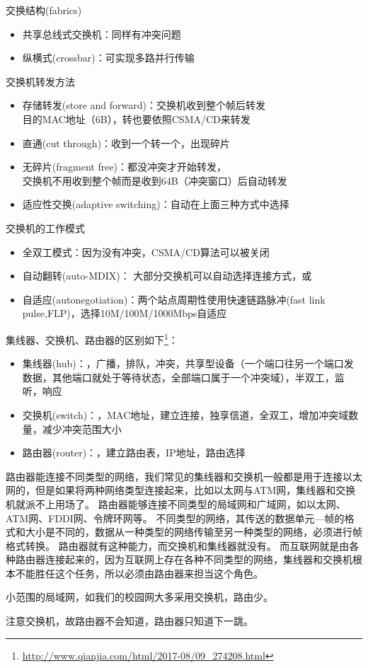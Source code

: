 \myhline
交换结构(fabrics)
\begin{itemize}
	\item 共享总线式交换机：同样有冲突问题
	\item 纵横式(crossbar)：可实现多路并行传输
\end{itemize}

\myhline
交换机转发方法
\begin{itemize}
\item 存储转发(store and forward)：交换机收到整个帧后转发\\
目的MAC地址（6B），转也要依照CSMA/CD来转发
\item 直通(cut through)：收到一个转一个，出现碎片
\item 无碎片(fragment free)：都没冲突才开始转发，\\
交换机不用收到整个帧而是收到64B（冲突窗口）后自动转发
\item 适应性交换(adaptive switching)：自动在上面三种方式中选择
\end{itemize}

\myhline
交换机的工作模式
\begin{itemize}
\item 全双工模式：因为没有冲突，CSMA/CD算法可以被关闭
\item 自动翻转(auto-MDIX)：
大部分交换机可以自动选择连接方式，或
\item 自适应(autonegotiation)：两个站点周期性使用快速链路脉冲(fast link pulse,FLP)，选择10M/100M/1000Mbps自适应
\end{itemize}


\myhline
集线器、交换机、路由器的区别如下\footnote{\url{http://www.qianjia.com/html/2017-08/09_274208.html}}：
\begin{itemize}
	\item 集线器(hub)：，广播，排队，冲突，共享型设备（一个端口往另一个端口发数据，其他端口就处于等待状态，全部端口属于一个冲突域），半双工，监听，响应
	\item 交换机(switch)：，MAC地址，建立连接，独享信道，全双工，增加冲突域数量，减少冲突范围大小
	\item 路由器(router)：，建立路由表，IP地址，路由选择
\end{itemize}

路由器能连接不同类型的网络，我们常见的集线器和交换机一般都是用于连接以太网的，但是如果将两种网络类型连接起来，比如以太网与ATM网，集线器和交换机就派不上用场了。
路由器能够连接不同类型的局域网和广域网，如以太网、ATM网、FDDI网、令牌环网等。
不同类型的网络，其传送的数据单元---帧的格式和大小是不同的，数据从一种类型的网络传输至另一种类型的网络，必须进行帧格式转换。
路由器就有这种能力，而交换机和集线器就没有。
而互联网就是由各种路由器连接起来的，因为互联网上存在各种不同类型的网络，集线器和交换机根本不能胜任这个任务，所以必须由路由器来担当这个角色。

小范围的局域网，如我们的校园网大多采用交换机，路由少。

注意交换机，故路由器不会知道，路由器只知道下一跳。